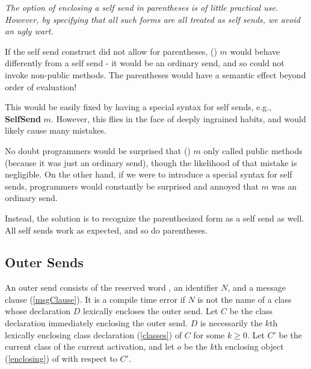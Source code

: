 \documentclass{article}
\begin{document}
{\it
The option of enclosing a self send in parentheses is of little practical use. However, by specifying that all such forms are all treated as self sends, we avoid an ugly wart.

If the self send construct did not allow for parentheses, (\SELF{}) $m$ would behave differently from a self send - it would be an ordinary send, and so could not invoke non-public methods. The parentheses would have a semantic effect beyond order of evaluation!  

This would be easily fixed by having a special syntax for self sends, e.g., \textbf{SelfSend} $m$. However, this flies in the face of deeply ingrained habits, and would likely cause many mistakes. 

No doubt programmers would be surprised that (\SELF{}) $m$ only called public methods (because it was just an ordinary send),  though the likelihood of that mistake is negligible. On the other hand, if we were to introduce a special syntax for self sends, programmers would constantly be surprised and annoyed that \SELF{} $m$ was an ordinary send.

Instead, the solution is to recognize the parenthesized form as a self send as well. All self sends work as expected, and so do parentheses.
}

\subsection{Outer Sends}
\label{out}


An outer send consists of the reserved word \OUTER, an identifier $N$, and a message clause  (\ref{msgClause}). It is a compile time error if $N$ is not the name of a class whose declaration $D$  lexically encloses the outer send. Let $C$ be the class declaration  immediately enclosing the outer send. $D$ is necessarily the  $k$th lexically enclosing class declaration (\ref{classes}) of $C$ for some $k \ge 0$.  
 Let $C'$ be the current class of the current activation, and let $o$ be the $k$th enclosing object  (\ref{enclosing}) of \SELF{} with respect to $C'$. 
\end{document}
